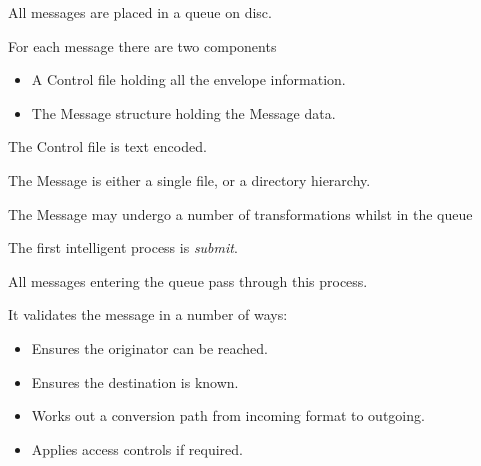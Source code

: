 
\begin{bwslide}
\begin{nrtc}
\item	All messages are placed in a queue on disc.

\item	For each message there are two components
	\begin{itemize}
	\item	A Control file holding all the envelope information.
	\item	The Message structure holding the Message data.
	\end{itemize}
\item	The Control file is text encoded.

\item	The Message is either a single file, or a directory hierarchy.

\item	The Message may undergo a number of transformations whilst in
	the queue
\end{nrtc}
\end{bwslide}

\begin{bwslide}
\begin{nrtc}
\item	The first intelligent process is {\em submit}.

\item	All messages entering the queue pass through this process.

\item	It validates the message in a number of ways:
	\begin{itemize}
	\item	Ensures the originator can be reached.
	\item	Ensures the destination is known.
	\item	Works out a conversion path from incoming format to outgoing.
	\item	Applies access controls if required.
	\end{itemize}
\end{nrtc}
\end{bwslide}

